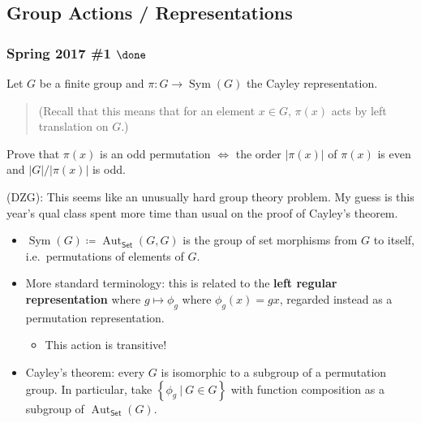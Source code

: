 \hypertarget{group-actions-representations}{%
\subsection{Group Actions /
Representations}\label{group-actions-representations}}

\hypertarget{spring-2017-1-done}{%
\subsubsection{\texorpdfstring{Spring 2017 \#1
\(\done\)}{Spring 2017 \#1 \textbackslash done}}\label{spring-2017-1-done}}

Let \(G\) be a finite group and \(\pi: G\to \operatorname{Sym}(G)\) the
Cayley representation.

\begin{quote}
(Recall that this means that for an element \(x\in G\), \(\pi(x)\) acts
by left translation on \(G\).)
\end{quote}

Prove that \(\pi(x)\) is an odd permutation \(\iff\) the order
\({\left\lvert {\pi(x)} \right\rvert}\) of \(\pi(x)\) is even and
\({\left\lvert {G} \right\rvert} / {\left\lvert {\pi(x)} \right\rvert}\)
is odd.

\begin{warnings}

(DZG): This seems like an unusually hard group theory problem. My guess
is this year's qual class spent more time than usual on the proof of
Cayley's theorem.

\end{warnings}

\begin{concept}

\envlist

\begin{itemize}
\tightlist
\item
  \(\operatorname{Sym}(G) \coloneqq{\operatorname{Aut}}_{\mathsf{Set}}(G, G)\)
  is the group of set morphisms from \(G\) to itself, i.e.~permutations
  of elements of \(G\).
\item
  More standard terminology: this is related to the \textbf{left regular
  representation} where \(g\mapsto \phi_g\) where \(\phi_g(x) = gx\),
  regarded instead as a permutation representation.

  \begin{itemize}
  \tightlist
  \item
    This action is transitive!
  \end{itemize}
\item
  Cayley's theorem: every \(G\) is isomorphic to a subgroup of a
  permutation group. In particular, take
  \(\left\{{ \phi_g {~\mathrel{\Big|}~}G\in G }\right\}\) with function
  composition as a subgroup of
  \({\operatorname{Aut}}_{\mathsf{Set}}(G)\).
\end{itemize}

\end{concept}

